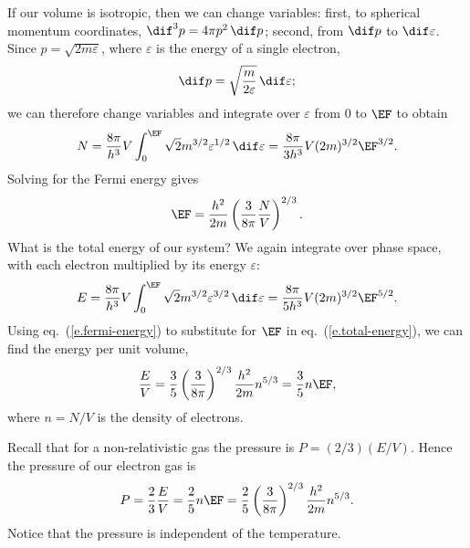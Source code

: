 If our volume is isotropic, then we can change variables: first, to spherical momentum coordinates, $\dif^{3}p = 4\pi p^{2}\,\dif p$; second, from $\dif p$ to $\dif\varepsilon$.  Since $p = \sqrt{2m\varepsilon}$, where $\varepsilon$ is the energy of a single electron,
\[
	\dif p = \sqrt{\frac{m}{2\varepsilon}}\,\dif \varepsilon;
\]
we can therefore change variables and integrate over $\varepsilon$ from $0$ to $\EF$ to obtain
\[
	N = \frac{8\pi}{h^{3}}V \int_{0}^{\EF} \sqrt{2}m^{3/2}\varepsilon^{1/2}\,\dif \varepsilon
	= \frac{8\pi}{3h^{3}} V (2m)^{3/2} \EF^{3/2}.
\]
Solving for the Fermi energy gives
\begin{equation}\label{e.fermi-energy}
	\EF = \frac{h^{2}}{2m}\left(\frac{3}{8\pi}\frac{N}{V}\right)^{2/3}.
\end{equation}
What is the total energy of our system? We again integrate over phase space, with each electron multiplied by its energy $\varepsilon$:
\begin{equation}\label{e.total-energy}
	E = \frac{8\pi}{h^{3}}V\int_{0}^{\EF}\sqrt{2}m^{3/2}\varepsilon^{3/2}\,\dif\varepsilon = \frac{8\pi}{5h^{3}}V(2m)^{3/2} \EF^{5/2}.
\end{equation}
Using eq.~(\ref{e.fermi-energy}) to substitute for $\EF$ in eq.~(\ref{e.total-energy}), we can find the energy per unit volume,
\[
	\frac{E}{V} = \frac{3}{5}\left(\frac{3}{8\pi}\right)^{2/3}\frac{h^{2}}{2m}n^{5/3} = \frac{3}{5} n \EF,
\]
where $n=N/V$ is the density of electrons.

Recall that for a non-relativistic gas the pressure is $P = (2/3)(E/V)$.  Hence the pressure of our electron gas is
\begin{equation}\label{e.pressure-electrons}
	P = \frac{2}{3}\frac{E}{V} = \frac{2}{5} n\EF
		= \frac{2}{5}\left(\frac{3}{8\pi}\right)^{2/3}\frac{h^{2}}{2m}n^{5/3}.
\end{equation}
Notice that the pressure is independent of the temperature.

\nocite{Feynman1989The-Feynman-Lec}

